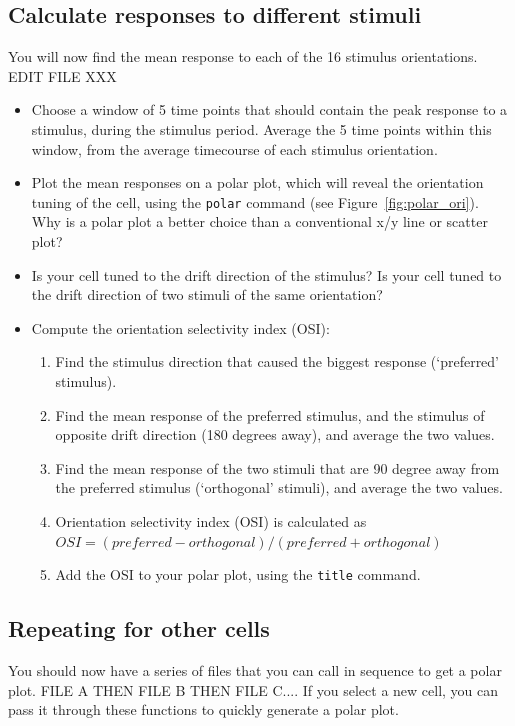 \documentclass[paper=a4, fontsize=11pt]{scrartcl} %
\numberwithin{equation}{section} %
\numberwithin{figure}{section} %
\numberwithin{table}{section} %
\begin{document}
\subsection{Calculate responses to different stimuli}
You will now find the mean response to each of the 16 stimulus orientations. EDIT FILE XXX
\begin{itemize}
\setlength{\parskip}{0.25em}
\item Choose a window of 5 time points that should contain the peak response to a stimulus, during the stimulus period. Average the 5 time points within this window, from the average timecourse of each stimulus orientation.
\item Plot the mean responses on a polar plot, which will reveal the orientation tuning of the cell, using the \texttt{polar} command (see Figure~\ref{fig:polar_ori}). Why is a polar plot a better choice than a conventional x/y line or scatter plot?
\item Is your cell tuned to the drift direction of the stimulus? Is your cell tuned to the drift direction of two stimuli of the same orientation?
\item Compute the orientation selectivity index (OSI):
    \begin{enumerate}
    \item Find the stimulus direction that caused the biggest response (`preferred' stimulus).
    \item Find the mean response of the preferred stimulus, and the stimulus of opposite drift direction (180 degrees away), and average the two values.
    \item Find the mean response of the two stimuli that are 90 degree away from the preferred stimulus (`orthogonal' stimuli), and average the two values.
    \item Orientation selectivity index (OSI) is calculated as \\ $OSI = {\left(preferred - orthogonal\right)} / {\left(preferred + orthogonal\right)}$
    \item Add the OSI to your polar plot, using the \texttt{title} command.
    \end{enumerate}
\end{itemize}

\subsection{Repeating for other cells}
You should now have a series of files that you can call in sequence to get a polar plot. FILE A THEN FILE B THEN FILE C.... If you select a new cell, you can pass it through these functions to quickly generate a polar plot. 
\end{document}
